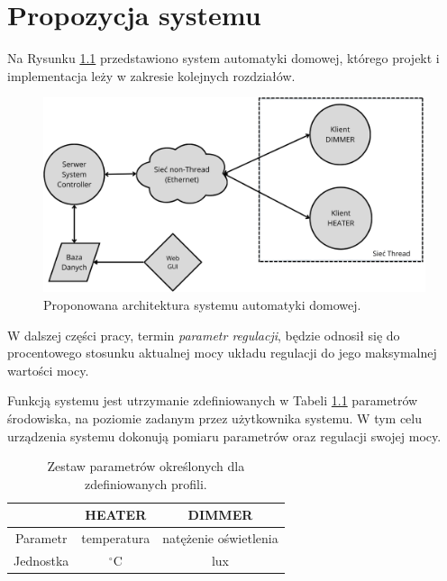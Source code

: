 \chapter{Propozycja systemu}
\label{cha:propozycja-systemu}

Na Rysunku \ref{fig:system-architecture} przedstawiono system automatyki domowej, którego projekt i implementacja leży w zakresie kolejnych rozdziałów.

\begin{figure}[H]
    \centering
    \includegraphics[width=0.8\linewidth]{graphics/system-architecture.png}
    \caption{Proponowana architektura systemu automatyki domowej.}
    \label{fig:system-architecture}
\end{figure}

W dalszej części pracy, termin \textit{parametr regulacji}, będzie odnosił się do procentowego stosunku aktualnej mocy układu regulacji do jego maksymalnej wartości mocy.

Funkcją systemu jest utrzymanie zdefiniowanych w Tabeli \ref{tab:profiles-parameters} parametrów środowiska, na poziomie zadanym przez użytkownika systemu. W tym celu urządzenia systemu dokonują pomiaru parametrów oraz regulacji swojej mocy.

\begin{table}[H]
    \centering
    \caption{Zestaw parametrów określonych dla zdefiniowanych profili.}
    \begin{tabular}{|c|c|c|}
         \hline
         \rowcolor{gray!20}
          & HEATER & DIMMER \\
         \hline
         \cellcolor{gray!20}Parametr & temperatura & natężenie oświetlenia \\
         \hline
         \cellcolor{gray!20}Jednostka & $^{\circ}$C & lux \\
         \hline
    \end{tabular}
    \label{tab:profiles-parameters}
\end{table}

